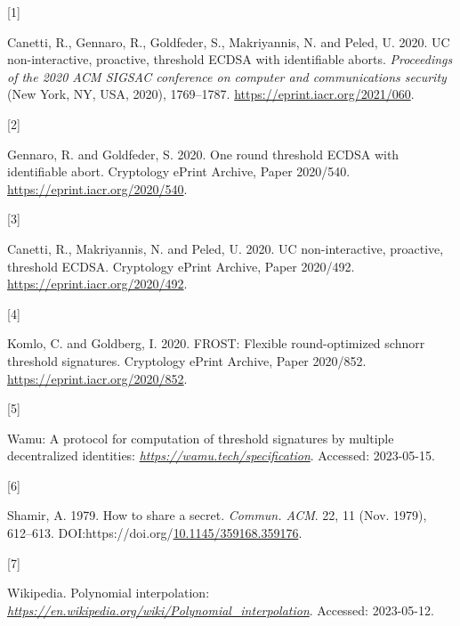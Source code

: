 \documentclass[
]{article}
\newlength{\cslhangindent}
\newlength{\csllabelwidth}
\newlength{\cslentryspacingunit} %
\newenvironment{CSLReferences}[2] %
 {%
  \setlength{\parindent}{0pt}
  \ifodd #1
  \let\oldpar\par
  \def\par{\hangindent=\cslhangindent\oldpar}
  \fi
  \setlength{\parskip}{#2\cslentryspacingunit}
 }%
 {}
\newcommand{\CSLLeftMargin}[1]{\parbox[t]{\csllabelwidth}{#1}}
\newcommand{\CSLRightInline}[1]{\parbox[t]{\linewidth - \csllabelwidth}{#1}\break}
\begin{document}
\hypertarget{refs}{}
\begin{CSLReferences}{0}{0}
\leavevmode{}%
\CSLLeftMargin{{[}1{]} }%
\CSLRightInline{Canetti, R., Gennaro, R., Goldfeder, S., Makriyannis, N.
and Peled, U. 2020. UC non-interactive, proactive, threshold ECDSA with
identifiable aborts. \emph{Proceedings of the 2020 ACM SIGSAC conference
on computer and communications security} (New York, NY, USA, 2020),
1769--1787. \url{https://eprint.iacr.org/2021/060}.}

\leavevmode{}%
\CSLLeftMargin{{[}2{]} }%
\CSLRightInline{Gennaro, R. and Goldfeder, S. 2020. One round threshold
ECDSA with identifiable abort. Cryptology ePrint Archive, Paper
2020/540. \url{https://eprint.iacr.org/2020/540}.}

\leavevmode{}%
\CSLLeftMargin{{[}3{]} }%
\CSLRightInline{Canetti, R., Makriyannis, N. and Peled, U. 2020. UC
non-interactive, proactive, threshold ECDSA. Cryptology ePrint Archive,
Paper 2020/492. \url{https://eprint.iacr.org/2020/492}.}

\leavevmode{}%
\CSLLeftMargin{{[}4{]} }%
\CSLRightInline{Komlo, C. and Goldberg, I. 2020. FROST: Flexible
round-optimized schnorr threshold signatures. Cryptology ePrint Archive,
Paper 2020/852. \url{https://eprint.iacr.org/2020/852}.}

\leavevmode{}%
\CSLLeftMargin{{[}5{]} }%
\CSLRightInline{Wamu: A protocol for computation of threshold signatures
by multiple decentralized identities:
\href{https://wamu.tech/specification}{\emph{https://wamu.tech/specification}}.
Accessed: 2023-05-15.}

\leavevmode{}%
\CSLLeftMargin{{[}6{]} }%
\CSLRightInline{Shamir, A. 1979. How to share a secret. \emph{Commun.
ACM}. 22, 11 (Nov. 1979), 612--613.
DOI:https://doi.org/\href{https://doi.org/10.1145/359168.359176}{10.1145/359168.359176}.}

\leavevmode{}%
\CSLLeftMargin{{[}7{]} }%
\CSLRightInline{Wikipedia. Polynomial interpolation:
\href{https://en.wikipedia.org/wiki/Polynomial_interpolation}{\emph{https://en.wikipedia.org/wiki/Polynomial\_interpolation}}.
Accessed: 2023-05-12.}

\end{CSLReferences}
\end{document}
